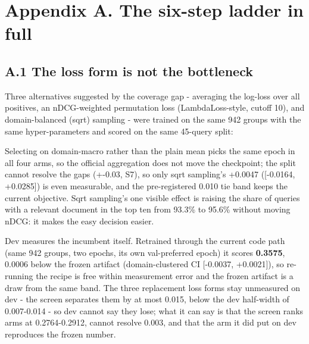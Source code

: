 \documentclass[11pt]{article}
\begin{document}
\section*{Appendix A. The six-step ladder in full}
\subsection*{A.1 The loss form is not the bottleneck}
Three alternatives suggested by the coverage gap - averaging the log-loss over all positives, an nDCG-weighted permutation loss (LambdaLoss-style, cutoff 10), and domain-balanced (sqrt) sampling - were trained on the same 942 groups with the same hyper-parameters and scored on the same 45-query split:

\begin{table}[t]
\centering
\footnotesize
{}%
\end{table}

Selecting on domain-macro rather than the plain mean picks the same epoch in all four arms, so the official aggregation does not move the checkpoint; the split cannot resolve the gaps (+-0.03, S7), so only sqrt sampling’s +0.0047 ([-0.0164, +0.0285]) is even measurable, and the pre-registered 0.010 tie band keeps the current objective. Sqrt sampling’s one visible effect is raising the share of queries with a relevant document in the top ten from 93.3\% to 95.6\% without moving nDCG: it makes the easy decision easier.

Dev measures the incumbent itself. Retrained through the current code path (same 942 groups, two epochs, its own val-preferred epoch) it scores \textbf{0.3575}, 0.0006 below the frozen artifact (domain-clustered CI [-0.0037, +0.0021]), so re-running the recipe is free within measurement error and the frozen artifact is a draw from the same band. The three replacement loss forms stay unmeasured on dev - the screen separates them by at most 0.015, below the dev half-width of 0.007-0.014 - so dev cannot say they lose; what it can say is that the screen ranks arms at 0.2764-0.2912, cannot resolve 0.003, and that the arm it did put on dev reproduces the frozen number.
\end{document}
